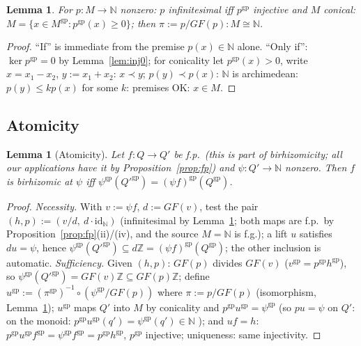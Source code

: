 \documentclass[11pt]{article}
\newtheorem{lemma}[theorem]{Lemma}
\theoremstyle{definition}
\newcommand{\gp}{\mathrm{gp}}
\newcommand{\Z}{\mathbb{Z}}
\begin{document}
\begin{lemma}\label{lem:infstruct}
For $p:M\to\mathbb N$ nonzero: $p$ infinitesimal iff $p^{\gp}$
injective and $M$ conical: $M=\{x\in M^{\gp}:p^{\gp}(x)\ge0\}$; then
$\pi:=p/{GF}(p):M\cong\mathbb N$.
\end{lemma}

\begin{proof}
``If'' is immediate from the premise $p(x)\in\mathbb N$ alone. ``Only
if'': $\ker p^{\gp}=0$ by Lemma~\ref{lem:inj0}; for conicality let
$p^{\gp}(x)>0$, write $x=x_1-x_2$, $y:=x_1+x_2$: $x\prec y$;
$p(y)\prec p(x)$: $\mathbb N$ is archimedean: $p(y)\le kp(x)$ for
some $k$: premises OK: $x\in M$.
\end{proof}

\subsection{Atomicity}

\begin{lemma}[Atomicity]\label{lem:atomic}
Let $f:Q\to Q'$ be f.p.\ \textup{(}this is part of birhizomicity;
all our applications have it by
Proposition~\ref{prop:fp}\textup{)} and
$\psi:Q'\to\mathbb N$ nonzero. Then $f$
is birhizomic at $\psi$ iff
$\psi^{\gp}(Q'^{\gp})=(\psi f)^{\gp}(Q^{\gp})$.
\end{lemma}

\begin{proof}
\emph{Necessity.} With $v:=\psi f$, $d:={GF}(v)$, test the pair
$(h,p):=(v/d,\ d\cdot\mathrm{id}_{\mathbb N})$
\textup{(}infinitesimal by Lemma~\ref{lem:infstruct}; both maps
are f.p.\ by Proposition~\ref{prop:fp}(ii)/(iv), and the source
$M=\mathbb N$ is f.g.\textup{)}; a lift $u$ satisfies $du=\psi$, hence
$\psi^{\gp}(Q'^{\gp})\subseteq d\Z=(\psi f)^{\gp}(Q^{\gp})$; the
other inclusion is automatic.
\emph{Sufficiency.} Given $(h,p)$: ${GF}(p)$ divides ${GF}(v)$
($v^{\gp}=p^{\gp}h^{\gp}$), so $\psi^{\gp}(Q'^{\gp})
={GF}(v)\Z\subseteq{GF}(p)\Z$; define
$u^{\gp}:=(\pi^{\gp})^{-1}\circ(\psi^{\gp}/{GF}(p))$ where
$\pi:=p/{GF}(p)$ (isomorphism, Lemma~\ref{lem:infstruct});
$u^{\gp}$ maps $Q'$ into $M$ by conicality and
$p^{\gp}u^{\gp}=\psi^{\gp}$ (so $pu=\psi$ on $Q'$: on the monoid:
$p^{\gp}u^{\gp}(q')=\psi^{\gp}(q')\in\mathbb N$ \checkmark); and
$uf=h$: $p^{\gp}u^{\gp}f^{\gp}=\psi^{\gp}f^{\gp}=p^{\gp}h^{\gp}$,
$p^{\gp}$ injective; uniqueness: same injectivity.
\end{proof}
\end{document}
